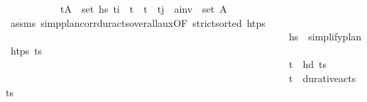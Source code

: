 \begin{isabellebody}
\ \ \ \ \ \ \ \ \ \ {\isasymlongrightarrow}\ {\isacharparenleft}{\kern0pt}{\isasymexists}{\isacharparenleft}{\kern0pt}t{\isacharprime}{\kern0pt}{\isacharcomma}{\kern0pt}A{\isacharparenright}{\kern0pt}\ {\isasymin}\ set\ hs{\isacharprime}{\kern0pt}{\isachardot}{\kern0pt}\ t\isactrlsub i\ {\isacharless}{\kern0pt}\ t{\isacharprime}{\kern0pt}\ {\isasymand}\ t{\isacharprime}{\kern0pt}\ {\isacharless}{\kern0pt}\ t\isactrlsub j\ {\isasymand}\ a\isactrlsub i\isactrlsub n\isactrlsub v\ {\isasymin}\ set\ A{\isacharparenright}{\kern0pt}{\isachardoublequoteclose}\isanewline
\ \ \ \ \ \ \isamarkupfalse%
\ assms\ simp{\isacharunderscore}{\kern0pt}plan{\isacharunderscore}{\kern0pt}corr{\isacharunderscore}{\kern0pt}dur{\isacharunderscore}{\kern0pt}acts{\isacharunderscore}{\kern0pt}overall{\isacharunderscore}{\kern0pt}aux{\isacharbrackleft}{\kern0pt}OF\ {\isacartoucheopen}strict{\isacharunderscore}{\kern0pt}sorted\ htps{\isacartoucheclose}\isanewline
\ \ \ \ \ \ \ \ \ \ \ \ \ \ \ \ \ \ \ \ \ \ \ \ \ \ \ \ \ \ \ \ \ \ \ \ \ \ \ \ \ \ \ \ \ \ \ \ \ \ \ \ \ \ \ \ \ {\isacartoucheopen}hs{\isacharprime}{\kern0pt}\ {\isacharequal}{\kern0pt}\ simplify{\isacharunderscore}{\kern0pt}plan\ htps\ {\isacharparenleft}{\kern0pt}{\isacharparenleft}{\kern0pt}t\isactrlsub {\isasympi}{\isacharcomma}{\kern0pt}{\isasympi}{\isacharparenright}{\kern0pt}{\isacharhash}{\kern0pt}{\isasympi}s\ \isanewline
\ \ \ \ \ \ \ \ \ \ \ \ \ \ \ \ \ \ \ \ \ \ \ \ \ \ \ \ \ \ \ \ \ \ \ \ \ \ \ \ \ \ \ \ \ \ \ \ \ \ \ \ \ \ \ \ \ {\isacartoucheopen}{\isacharparenleft}{\kern0pt}t\isactrlsub {\isasympi}{\isacharcomma}{\kern0pt}{\isasympi}{\isacharparenright}{\kern0pt}\ {\isacharequal}{\kern0pt}\ hd\ {\isacharparenleft}{\kern0pt}{\isacharparenleft}{\kern0pt}t\isactrlsub {\isasympi}{\isacharcomma}{\kern0pt}{\isasympi}{\isacharparenright}{\kern0pt}{\isacharhash}{\kern0pt}{\isasympi}s\ \isanewline
\ \ \ \ \ \ \ \ \ \ \ \ \ \ \ \ \ \ \ \ \ \ \ \ \ \ \ \ \ \ \ \ \ \ \ \ \ \ \ \ \ \ \ \ \ \ \ \ \ \ \ \ \ \ \ \ \ {\isacartoucheopen}{\isacharparenleft}{\kern0pt}t\isactrlsub {\isasympi}{\isacharcomma}{\kern0pt}{\isasympi}{\isacharparenright}{\kern0pt}\ {\isasymin}\ durative{\isacharunderscore}{\kern0pt}acts\ {\isacharparenleft}{\kern0pt}{\isacharparenleft}{\kern0pt}t\isactrlsub {\isasympi}{\isacharcomma}{\kern0pt}{\isasympi}{\isacharparenright}{\kern0pt}{\isacharhash}{\kern0pt}{\isasympi}s\isanewline

\end{isabellebody}
